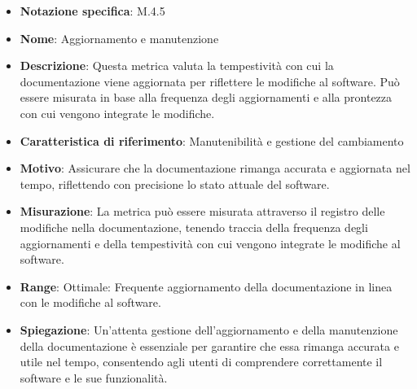\begin{itemize}
    \item \textbf{Notazione specifica}: M.4.5
    \item \textbf{Nome}: Aggiornamento e manutenzione
    \item \textbf{Descrizione}: Questa metrica valuta la tempestività con cui la documentazione viene aggiornata per riflettere le modifiche al software. Può essere misurata in base alla frequenza degli aggiornamenti e alla prontezza con cui vengono integrate le modifiche.
    \item \textbf{Caratteristica di riferimento}: Manutenibilità e gestione del cambiamento
    \item \textbf{Motivo}: Assicurare che la documentazione rimanga accurata e aggiornata nel tempo, riflettendo con precisione lo stato attuale del software.
    \item \textbf{Misurazione}: La metrica può essere misurata attraverso il registro delle modifiche nella documentazione, tenendo traccia della frequenza degli aggiornamenti e della tempestività con cui vengono integrate le modifiche al software.
    \item \textbf{Range}: Ottimale: Frequente aggiornamento della documentazione in linea con le modifiche al software.
    \item \textbf{Spiegazione}: Un'attenta gestione dell'aggiornamento e della manutenzione della documentazione è essenziale per garantire che essa rimanga accurata e utile nel tempo, consentendo agli utenti di comprendere correttamente il software e le sue funzionalità.
\end{itemize}
